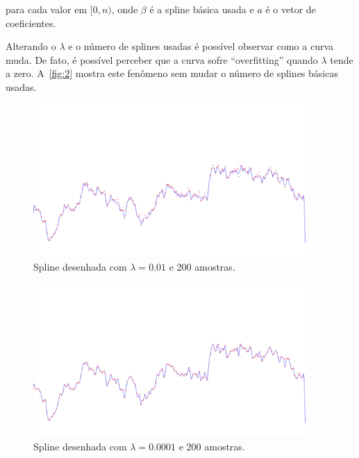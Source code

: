 \documentclass[12pt]{article}
\theoremstyle{plain}
\numberwithin{equation}{section}
\begin{document}
para cada valor em $[0,n)$, onde $\beta$ é a spline básica usada e $a$ é o vetor de coeficientes.

Alterando o $\lambda$ e o número de splines usadas é possível observar como a curva muda. De fato,
é possível perceber que a curva sofre ``overfitting'' quando $\lambda$ tende a zero.
A~\autoref{fig:2} mostra este fenômeno sem mudar o número de splines básicas usadas.
\begin{figure}[h]
  \centering\includegraphics[width=0.925\textwidth]{imgs/200_0-01.png}
  \caption{Spline desenhada com $\lambda=0.01$ e 200 amostras.\label{fig:1}}
\end{figure}
\begin{figure}[H]
  \centering\includegraphics[width=0.925\textwidth]{imgs/200_0-0001.png}
  \caption{Spline desenhada com $\lambda=0.0001$ e 200 amostras.\label{fig:2}}
\end{figure}
\end{document}
